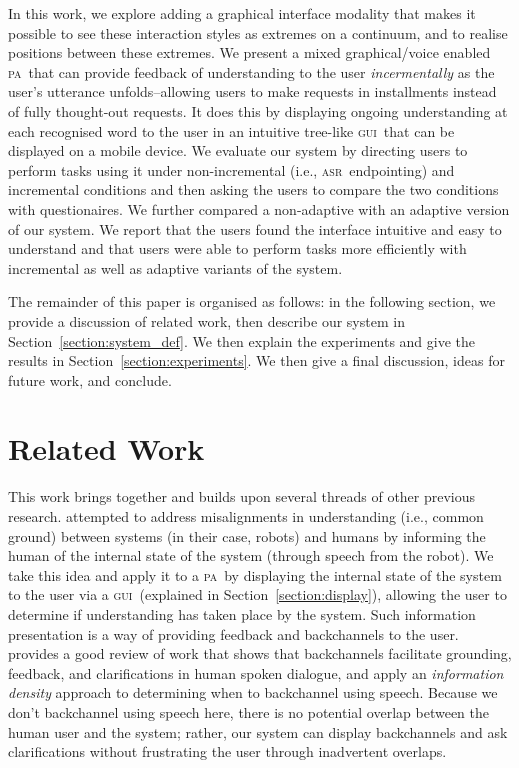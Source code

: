 \documentclass[11pt]{article}
\newcommand{\asr}[0]{\textsc{asr}}
\newcommand{\ui}[0]{\textsc{gui}}
\newcommand{\pa}[0]{\textsc{pa}}
\begin{document}
In this work, we explore adding a graphical interface modality that makes it possible to see these interaction styles as extremes on a continuum, and to realise positions between these extremes. We present a mixed graphical/voice enabled \pa\ that can provide feedback of understanding to the user \emph{incermentally} as the user's utterance unfolds--allowing users to make requests in installments instead of fully thought-out requests. It does this by displaying ongoing understanding at each recognised word to the user in an intuitive tree-like \ui\ that can be displayed on a mobile device. We evaluate our system by directing users to perform tasks using it under non-incremental (i.e., \asr\ endpointing) and incremental conditions and then asking the users to compare the two conditions with questionaires. We further compared a non-adaptive with an adaptive version of our system. We report that the users found the interface intuitive and easy to understand and that users were able to perform tasks more efficiently with incremental as well as adaptive variants of the system.

The remainder of this paper is organised as follows: in the following section, we provide a discussion of related work, then describe our system in Section~\ref{section:system_def}. We then explain the experiments and give the results in Section~\ref{section:experiments}. We then give a final discussion, ideas for future work, and conclude. 

\section{Related Work}
\label{section:related_work}

This work brings together and builds upon several threads of other previous research.  attempted to address misalignments in understanding (i.e., common ground) \cite{clarkschaefer:contrdis} between systems (in their case, robots) and humans by informing the human of the internal state of the system (through speech from the robot). We take this idea and apply it to a \pa\ by displaying the internal state of the system to the user via a \ui\ (explained in Section~\ref{section:display}), allowing the user to determine if understanding has taken place by the system. Such information presentation is a way of providing feedback and backchannels to the user.  provides a good review of work that shows that backchannels facilitate grounding, feedback, and clarifications in human spoken dialogue, and apply an \emph{information density} approach to determining when to backchannel using speech. Because we don't backchannel using speech here, there is no potential overlap between the human user and the system; rather, our system can display backchannels and ask clarifications without frustrating the user through inadvertent overlaps.
\end{document}
